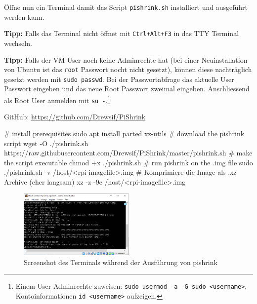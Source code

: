 \documentclass[
  11pt,
  a4paperpaper,
  oneside, openany  ,captions=tableheading
]{scrbook}
\newenvironment{Shaded}{\begin{snugshade}}{\end{snugshade}}
\newcommand{\AttributeTok}[1]{\textcolor[rgb]{0.40,0.45,0.13}{#1}}
\newcommand{\CommentTok}[1]{\textcolor[rgb]{0.37,0.37,0.37}{#1}}
\newcommand{\FunctionTok}[1]{\textcolor[rgb]{0.28,0.35,0.67}{#1}}
\newcommand{\NormalTok}[1]{\textcolor[rgb]{0.00,0.23,0.31}{#1}}
\newcommand{\OperatorTok}[1]{\textcolor[rgb]{0.37,0.37,0.37}{#1}}
\theoremstyle{definition}
\theoremstyle{remark}
\begin{document}
Öffne nun ein Terminal damit das Script \texttt{pishrink.sh} installiert
und ausgeführt werden kann.

\textbf{Tipp:} Falls das Terminal nicht öffnet mit \texttt{Ctrl+Alt+F3}
in das TTY Terminal wechseln.

\textbf{Tipp:} Falls der VM User noch keine Adminrechte hat (bei einer
Neuinstallation von Ubuntu ist das \texttt{root} Passwort nocht nicht
gesetzt), können diese nachträglich gesetzt werden mit
\texttt{sudo\ passwd}. Bei der Passwortabfrage das aktuelle User
Passwort eingeben und das neue Root Passwort zweimal eingeben.
Anschliessend als Root User anmelden mit \texttt{su\ -}.\footnote{Einem
  User Adminrechte zuweisen:
  \texttt{sudo\ usermod\ -a\ -G\ sudo\ \textless{}username\textgreater{}},
  Kontoinformationen \texttt{id\ \textless{}username\textgreater{}}
  aufzeigen.}

GitHub: \url{https://github.com/Drewsif/PiShrink}

\begin{Shaded}
\begin{Highlighting}[]
\CommentTok{\# install prerequisites}
\FunctionTok{sudo}\NormalTok{ apt install parted xz{-}utils}
\CommentTok{\# download the pishrink script}
\FunctionTok{wget} \AttributeTok{{-}O}\NormalTok{ ./pishrink.sh https://raw.githubusercontent.com/Drewsif/PiShrink/master/pishrink.sh}
\CommentTok{\# make the script executable}
\FunctionTok{chmod}\NormalTok{ +x ./pishrink.sh}
\CommentTok{\# run pishrink on the .img file}
\FunctionTok{sudo}\NormalTok{ ./pishrink.sh }\AttributeTok{{-}v}\NormalTok{ /host/}\OperatorTok{\textless{}}\NormalTok{rpi{-}imagefile}\OperatorTok{\textgreater{}}\NormalTok{.img}
\CommentTok{\# Komprimiere die Image als .xz Archive (eher langsam)}
\FunctionTok{xz} \AttributeTok{{-}z} \AttributeTok{{-}9e}\NormalTok{ /host/}\OperatorTok{\textless{}}\NormalTok{rpi{-}imagefile}\OperatorTok{\textgreater{}}\NormalTok{.img}
\end{Highlighting}
\end{Shaded}

\begin{figure}[H]

{\centering \includegraphics[width=0.5\textwidth,height=\textheight]{images/raspberrypi_image_verkleinern_04.png}

}

\caption{Screenshot des Terminals während der Ausführung von pishrink}

\end{figure}%
\end{document}
